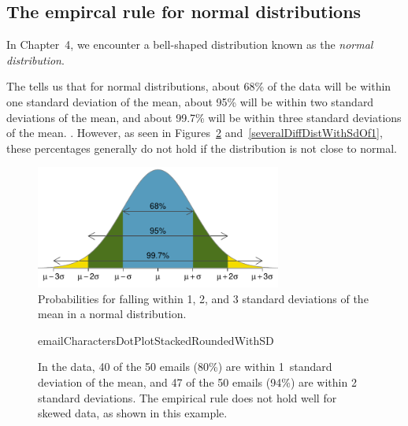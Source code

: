 \subsection{The empircal rule for normal distributions}

In Chapter~4, we encounter a bell-shaped distribution known as the \emph{normal distribution}.  

The  tells us that for normal distributions, about 68\% of the data will be within one standard deviation of the mean, about 95\% will be within two standard deviations of the mean, and about 99.7\% will be within three standard deviations of the mean. . However, as seen in Figures~\ref{emailCharactersDotPlotStackedRoundedWithSD} and~\ref{severalDiffDistWithSdOf1}, these percentages generally do not hold if the distribution is not close to normal.  

\begin{figure}[h]
\centering
\includegraphics[width=0.72\textwidth]{ch_distributions/figures/6895997/6895997}
\caption{Probabilities for falling within 1, 2, and 3 standard deviations of the mean in a normal distribution.}
\label{6895997}
\end{figure}


\begin{figure}[h]
\centering
{}
    {emailCharactersDotPlotStackedRoundedWithSD}
\caption{In the  data, 40 of the 50 emails (80\%) are within 1~standard deviation of the mean, and 47 of the 50 emails (94\%) are within 2 standard deviations. The empirical rule does not hold well for skewed data, as shown in this example.}
\label{emailCharactersDotPlotStackedRoundedWithSD}
\end{figure}


